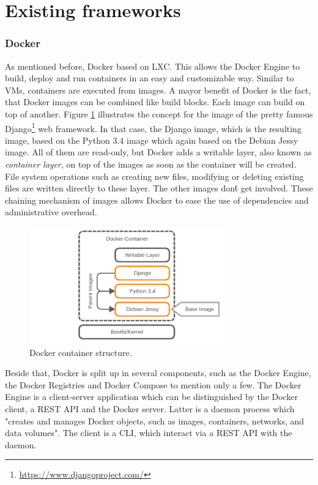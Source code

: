 \section{Existing frameworks}

\subsubsection{Docker}
As mentioned before, Docker based on \ac{LXC}.
This allows the Docker Engine to build, deploy and run containers in an easy and customizable way.
Similar to \acp{VM}, containers are executed from images.
A mayor benefit of Docker is the fact, that Docker images can be combined like build blocks.
Each image can build on top of another.
Figure \ref{fig:docker_container_structure} illustrates the concept for the image of the pretty famous Django\footnote{\url{https://www.djangoproject.com/}} web framework.
In that case, the Django image, which is the resulting image, based on the Python 3.4 image which again based on the Debian Jessy image.
All of them are read-only, but Docker adds a writable layer, also known as \textit{container layer}, on top of the images as soon as the container will be created.
File system operations such as creating new files, modifying or deleting existing files are written directly to these layer.\cite[cf.]{dockerImages}
The other images don\'t get involved.
These chaining mechanism of images allows Docker to ease the use of dependencies and administrative overhead.

\begin{figure}[H]
    \centering
    \includegraphics[width=0.75\textwidth]{resources/images/docker_container_structure.png}
    \caption[Docker container structure]{Docker container structure.}
    \label{fig:docker_container_structure}
\end{figure}

Beside that, Docker is split up in several components, such as the Docker Engine, the Docker Registries and Docker Compose to mention only a few.
The Docker Engine is a client-server application which can be distinguished by the Docker client, a \ac{REST} \ac{API} and the Docker server.
Latter is a daemon process which "creates and manages Docker objects, such as images, containers, networks, and data volumes"\cite{dockerEngine}.
The client is a \ac{CLI}, which interact via a \ac{REST} \ac{API} with the daemon.\cite[cf.]{dockerEngine}

